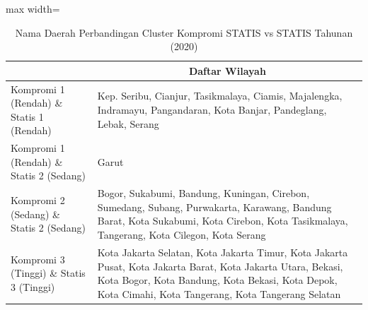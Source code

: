 \begin{table}[H]
\centering
\caption{Nama Daerah Perbandingan Cluster Kompromi STATIS vs STATIS Tahunan (2020)} \label{tab:app2comp_statis_name_2020}
\begin{adjustbox}{max width=\textwidth}
\begin{tabular}{|>{\centering\arraybackslash}p{4cm}|p{10cm}|}
\hline
\multicolumn{1}{|c|}{\textbf{Kategori}} & \multicolumn{1}{c|}{\textbf{Daftar Wilayah}} \\
\hline
Kompromi 1 (Rendah) \& Statis 1 (Rendah) & Kep. Seribu, Cianjur, Tasikmalaya, Ciamis, Majalengka, Indramayu, Pangandaran, Kota Banjar, Pandeglang, Lebak, Serang \\
\hline
Kompromi 1 (Rendah) \& Statis 2 (Sedang) & Garut \\
\hline
Kompromi 2 (Sedang) \& Statis 2 (Sedang) & Bogor, Sukabumi, Bandung, Kuningan, Cirebon, Sumedang, Subang, Purwakarta, Karawang, Bandung Barat, Kota Sukabumi, Kota Cirebon, Kota Tasikmalaya, Tangerang, Kota Cilegon, Kota Serang \\
\hline
Kompromi 3 (Tinggi) \& Statis 3 (Tinggi) & Kota Jakarta Selatan, Kota Jakarta Timur, Kota Jakarta Pusat, Kota Jakarta Barat, Kota Jakarta Utara, Bekasi, Kota Bogor, Kota Bandung, Kota Bekasi, Kota Depok, Kota Cimahi, Kota Tangerang, Kota Tangerang Selatan \\
\hline
\end{tabular}
\end{adjustbox}
\end{table}